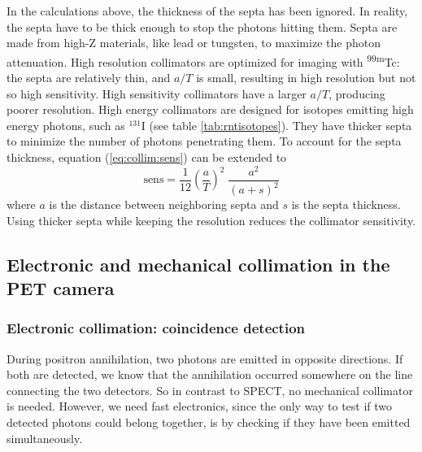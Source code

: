 In the calculations above, the thickness of the septa has been
ignored. In reality, the septa have to be thick enough to stop the
photons hitting them. Septa are made from high-Z materials, like lead
or tungsten, to maximize the photon attenuation. High resolution
collimators are optimized for imaging with \textsuperscript{99m}Tc: the septa are
relatively thin, and $a/T$ is small, resulting in high resolution but
not so high sensitivity. High sensitivity collimators have a larger
$a/T$, producing poorer resolution. High energy collimators are
designed for isotopes emitting high energy photons, such as $^{131}$I
(see table \ref{tab:rntisotopes}). They have thicker septa to
minimize the number of photons penetrating them. To account for
the septa thickness, equation (\ref{eq:collim:sens}) can be extended
to
\begin{equation}
  \mbox{sens} =  \frac{1}{12} \left( \frac{a}{T} \right)^2
                 \;\frac{a^2}{(a+s)^2}
\end{equation}
where $a$ is the distance between neighboring septa and $s$ is the septa
thickness. Using thicker septa while keeping the resolution reduces
the collimator sensitivity.


\subsection{Electronic and mechanical collimation in the PET camera
   \label{sec:petcollim}}
\subsubsection{Electronic collimation: coincidence detection}
During positron annihilation, two photons are emitted in opposite
directions. If both are detected, we know that the annihilation occurred
somewhere on the line connecting the two detectors. So in contrast to SPECT,
no mechanical collimator is needed. However, we need fast electronics, since
the only way to test if two detected photons could belong together, is by
checking if they have been emitted simultaneously.

